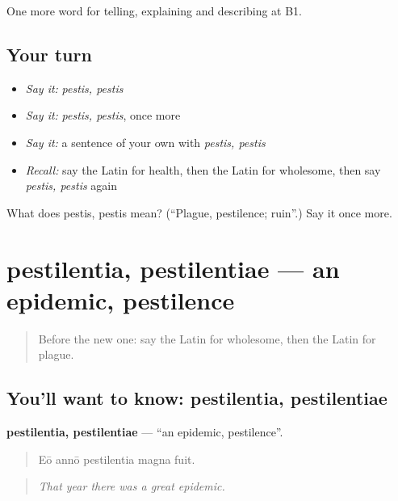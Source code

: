 \begin{grammarlens}[title={What you've built}]
One more word for telling, explaining and describing at B1.
\end{grammarlens}

\subsection*{Your turn}
\begin{itemize}
\raggedright
  \item \emph{Say it:} \emph{pestis, pestis}
  \item \emph{Say it:} \emph{pestis, pestis}, once more
  \item \emph{Say it:} a sentence of your own with \emph{pestis, pestis}
  \item \emph{Recall:} say the Latin for health, then the Latin for wholesome, then say \emph{pestis, pestis} again
\end{itemize}

\begin{tcolorbox}[breakable,colback=teal!4,colframe=teal!35!black,title={Before you move on}]
What does pestis, pestis mean? (\textquotedblleft{}Plague, pestilence; ruin\textquotedblright{}.) Say it once more.
\end{tcolorbox}
\section[pestilentia, pestilentiae]{pestilentia, pestilentiae — an epidemic, pestilence}

\label{lesson:LA-C524-pestilentia}



\begin{quote}
Before the new one: say the Latin for wholesome, then the Latin for plague.
\end{quote}

\subsection*{You'll want to know: pestilentia, pestilentiae}
\textbf{pestilentia, pestilentiae} — \textquotedblleft{}an epidemic, pestilence\textquotedblright{}.

\begin{quote}
Eō annō pestilentia magna fuit.
\end{quote}

\begin{quote}
\emph{That year there was a great epidemic.}
\end{quote}

